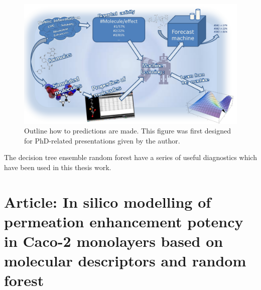 \begin{figure}[!htpb]
\includegraphics[width=\textwidth, height=\textheight, keepaspectratio]{graphics/predictPotencySummary.pdf}
\caption{Outline how to predictions are made. This figure was first designed for PhD-related presentations given by the author.}
\label{predictPotencySummary}
\end{figure}

The decision tree ensemble random forest have a series of useful diagnostics which have been used in this thesis work.

\section{Article: In silico modelling of permeation enhancement potency in Caco-2
monolayers based on molecular descriptors and random forest}
\label{article:predAbs}

\newpage




